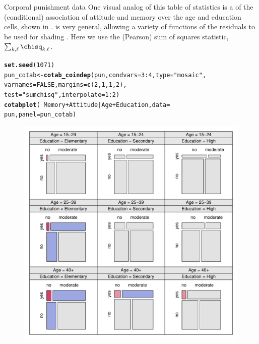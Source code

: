 \documentclass[11pt]{book}\usepackage[]{graphicx}\usepackage[]{color}
\makeatletter
\newcommand{\hlnum}[1]{\textcolor[rgb]{0.686,0.059,0.569}{#1}}%
\newcommand{\hlstr}[1]{\textcolor[rgb]{0.192,0.494,0.8}{#1}}%
\newcommand{\hlopt}[1]{\textcolor[rgb]{0,0,0}{#1}}%
\newcommand{\hlstd}[1]{\textcolor[rgb]{0.345,0.345,0.345}{#1}}%
\newcommand{\hlkwb}[1]{\textcolor[rgb]{0.69,0.353,0.396}{#1}}%
\newcommand{\hlkwc}[1]{\textcolor[rgb]{0.333,0.667,0.333}{#1}}%
\newcommand{\hlkwd}[1]{\textcolor[rgb]{0.737,0.353,0.396}{\textbf{#1}}}%
\newenvironment{kframe}{%
 \def\at@end@of@kframe{}%
 \ifinner\ifhmode%
  \def\at@end@of@kframe{\end{minipage}}%
  \begin{minipage}{\columnwidth}%
 \fi\fi%
 \def\FrameCommand##1{\hskip\@totalleftmargin \hskip-\fboxsep
 \colorbox{shadecolor}{##1}\hskip-\fboxsep
     \hskip-\linewidth \hskip-\@totalleftmargin \hskip\columnwidth}%
 \MakeFramed {\advance\hsize-\width
   \@totalleftmargin\z@ \linewidth\hsize
   \@setminipage}}%
 {\par\unskip\endMakeFramed%
 \at@end@of@kframe}
\newenvironment{knitrout}{}{} %
\renewenvironment{knitrout}{\small\renewcommand{\baselinestretch}{.85}}{} %
\makeatother
\begin{document}
\begin{Example}[punish]{Corporal punishment data}
One visual analog of this table of \chisq statistics is a  of the
(conditional) association of attitude and memory over the age and education cells,
shown in .   is very general, allowing
a variety of functions of the residuals to be used for shading
\citep{Zeileis-etal:2007}.
Here we use
the (Pearson) sum of squares statistic, $\sum_{k, \ell} \chisq_{k,\ell}$.
\begin{knitrout}
\color{fgcolor}\begin{kframe}
\begin{alltt}
\hlkwd{set.seed}\hlstd{(}\hlnum{1071}\hlstd{)}
\hlstd{pun_cotab} \hlkwb{<-} \hlkwd{cotab_coindep}\hlstd{(pun,} \hlkwc{condvars} \hlstd{=} \hlnum{3}\hlopt{:}\hlnum{4}\hlstd{,} \hlkwc{type} \hlstd{=} \hlstr{"mosaic"}\hlstd{,}
  \hlkwc{varnames} \hlstd{=} \hlnum{FALSE}\hlstd{,} \hlkwc{margins} \hlstd{=} \hlkwd{c}\hlstd{(}\hlnum{2}\hlstd{,} \hlnum{1}\hlstd{,} \hlnum{1}\hlstd{,} \hlnum{2}\hlstd{),}
  \hlkwc{test} \hlstd{=} \hlstr{"sumchisq"}\hlstd{,} \hlkwc{interpolate} \hlstd{=} \hlnum{1}\hlopt{:}\hlnum{2}\hlstd{)}
\hlkwd{cotabplot}\hlstd{(}\hlopt{~} \hlstd{Memory} \hlopt{+} \hlstd{Attitude} \hlopt{|} \hlstd{Age} \hlopt{+} \hlstd{Education,} \hlkwc{data} \hlstd{=}
            \hlstd{pun,} \hlkwc{panel} \hlstd{= pun_cotab)}
\end{alltt}
\end{kframe}\begin{figure}[!htb]


\centerline{\includegraphics[width=.95\textwidth]{ch05/fig/punish-cond1} }


\end{figure}
\end{knitrout}
\end{Example}
\end{document}
